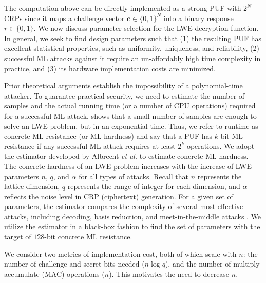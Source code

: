 The computation above can be directly implemented as a strong PUF with $2^N$ CRPs since it maps a challenge vector $\mathbf{c}\in \{0,1\}^N$ into a binary response $r\in\{0,1\}$.
We now discuss parameter selection for the LWE decryption function. 
In general, we seek to find design parameters such that 
(1) the resulting PUF has excellent statistical properties, such as uniformity, uniqueness, and reliability, 
(2) successful ML attacks against it require an un-affordably high time complexity in practice, and 
(3) its hardware implementation costs are minimized. 

Prior theoretical arguments establish the impossibility of a polynomial-time attacker. 
To guarantee practical security, we need to estimate the number of samples and the actual running time (or a number of CPU operations) required for a successful ML attack. \cite{regev2009lattices} shows that a small number of samples are enough to solve an LWE problem, but in an exponential time. 
Thus, we refer to runtime as concrete ML resistance (or ML hardness) and say that a PUF has $k$-bit ML resistance if any successful ML attack requires at least $2^k$ operations. 
We adopt the estimator developed by Albrecht \emph{et al.} \cite{albrecht2015concrete} to estimate concrete ML hardness. 
The concrete hardness of an LWE problem increases with the increase of LWE parameters $n$, $q$, and $\alpha$ for all types of attacks.
Recall that $n$ represents the lattice dimension, $q$ represents the range of integer for each dimension, and $\alpha$ reflects the noise level in CRP (ciphertext) generation.
For a given set of parameters, the estimator compares the complexity of several most effective attacks, including decoding, basis reduction, and meet-in-the-middle attacks %
\cite{howgrave2007hybrid,lindner2011better}. 
We utilize the estimator in a black-box fashion to find the set of parameters with the target of $128$-bit concrete ML resistance. 

We consider two metrics of implementation cost, both of which scale with $n$: the number of challenge and secret bits needed ($n\log q$), and the number of multiply-accumulate (MAC) operations ($n$).
This motivates the need to decrease $n$.

